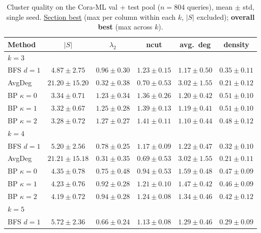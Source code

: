 \documentclass[11pt]{article}
\begin{document}
\begin{table}[t]
\centering
\footnotesize
\caption{Cluster quality on the Cora-ML val + test pool ($n = 804$
queries), mean $\pm$ std, single seed. \underline{Section best} (max
per column within each $k$, $|S|$ excluded); \textbf{overall best}
(max across $k$).}
\label{tab:cluster-quality}
\begin{tabular}{lccccc}
\toprule
Method & $|S|$ & $\lambda_2$ & ncut & avg.~deg & density \\
\midrule
\multicolumn{6}{l}{\textit{$k = 3$}} \\
BFS $d{=}1$       & $4.87 \pm 2.75$    & $0.96 \pm 0.30$ & $1.23 \pm 0.15$ & $1.17 \pm 0.50$ & $0.35 \pm 0.11$ \\
AvgDeg            & $21.20 \pm 15.20$  & $0.32 \pm 0.38$ & $0.70 \pm 0.53$ & \underline{\textbf{$3.02 \pm 1.55$}} & $0.21 \pm 0.12$ \\
BP $\kappa{=}0$   & $3.34 \pm 0.71$    & $1.23 \pm 0.34$ & $1.36 \pm 0.26$ & $1.20 \pm 0.42$ & \underline{\textbf{$0.51 \pm 0.10$}} \\
BP $\kappa{=}1$   & $3.32 \pm 0.67$    & $1.25 \pm 0.28$ & $1.39 \pm 0.13$ & $1.19 \pm 0.41$ & \underline{$0.51 \pm 0.10$} \\
BP $\kappa{=}2$   & $3.28 \pm 0.72$    & \underline{\textbf{$1.27 \pm 0.27$}} & \underline{\textbf{$1.41 \pm 0.11$}} & $1.10 \pm 0.44$ & $0.48 \pm 0.12$ \\
\midrule
\multicolumn{6}{l}{\textit{$k = 4$}} \\
BFS $d{=}1$       & $5.20 \pm 2.56$    & $0.78 \pm 0.25$ & $1.17 \pm 0.09$ & $1.22 \pm 0.47$ & $0.32 \pm 0.10$ \\
AvgDeg            & $21.21 \pm 15.18$  & $0.31 \pm 0.35$ & $0.69 \pm 0.53$ & \underline{$3.02 \pm 1.55$} & $0.21 \pm 0.11$ \\
BP $\kappa{=}0$   & $4.35 \pm 0.78$    & $0.75 \pm 0.48$ & $0.94 \pm 0.53$ & $1.59 \pm 0.48$ & \underline{$0.47 \pm 0.09$} \\
BP $\kappa{=}1$   & $4.23 \pm 0.76$    & $0.92 \pm 0.28$ & $1.21 \pm 0.10$ & $1.47 \pm 0.42$ & $0.46 \pm 0.09$ \\
BP $\kappa{=}2$   & $4.19 \pm 0.72$    & \underline{$0.94 \pm 0.28$} & \underline{$1.24 \pm 0.08$} & $1.34 \pm 0.46$ & $0.42 \pm 0.12$ \\
\midrule
\multicolumn{6}{l}{\textit{$k = 5$}} \\
BFS $d{=}1$       & $5.72 \pm 2.36$    & $0.66 \pm 0.24$ & $1.13 \pm 0.08$ & $1.29 \pm 0.46$ & $0.29 \pm 0.09$ \\

\end{tabular}
\end{table}
\end{document}
